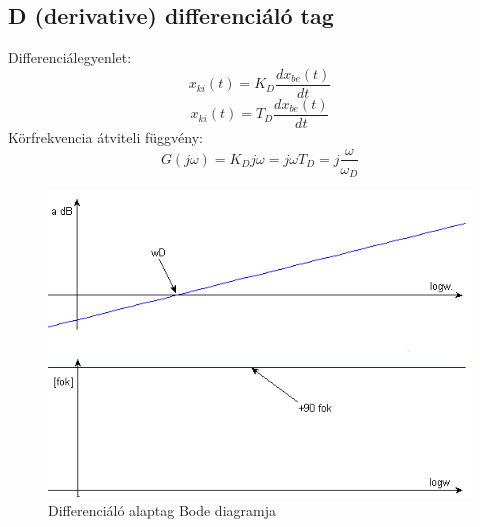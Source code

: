 \documentclass[11pt,a4paper]{article}
\begin{document}
\subsection{D (derivative) differenciáló tag}
Differenciálegyenlet:$$x_{ki}\left(t\right) = K_D\frac{dx_{be}\left(t\right)}{dt}$$
$$x_{ki}\left(t\right) = T_D\frac{dx_{be}\left(t\right)}{dt}$$
Körfrekvencia átviteli függvény:$$G\left(j\omega\right) = K_D j\omega = j\omega T_D = j\frac{\omega}{\omega_D}$$
\begin{figure}[hbtp]
    	 \centering
		\includegraphics[scale=1.0]{29_d_tag_bode.png}
		\caption{Differenciáló alaptag Bode diagramja}
\end{figure}
\newpage
\end{document}
